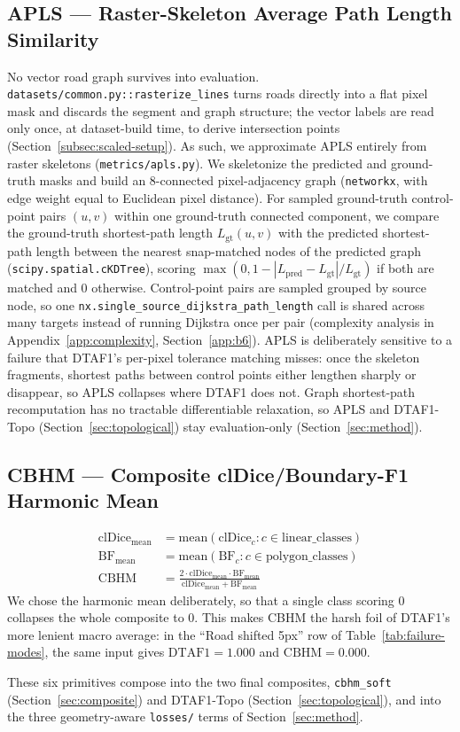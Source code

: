 \subsection{APLS --- Raster-Skeleton Average Path Length Similarity}
\label{subsec:apls}

No vector road graph survives into evaluation.
\texttt{datasets/common.py::\allowbreak{}rasterize\_lines} turns roads directly into a flat pixel
mask and discards the segment and graph structure; the vector labels are read only once, at
dataset-build time, to derive intersection points (Section~\ref{subsec:scaled-setup}). As such, we
approximate APLS entirely from raster skeletons (\texttt{metrics/apls.py}). We skeletonize the
predicted and ground-truth masks and build an 8-connected pixel-adjacency graph (\texttt{networkx},
with edge weight equal to Euclidean pixel distance). For sampled ground-truth control-point pairs
$(u,v)$ within one ground-truth connected component, we compare the ground-truth shortest-path
length $L_{\mathrm{gt}}(u,v)$ with the predicted shortest-path length between the nearest
snap-matched nodes of the predicted graph (\texttt{scipy.spatial.cKDTree}), scoring
$\max(0, 1 - |L_{\mathrm{pred}} - L_{\mathrm{gt}}| / L_{\mathrm{gt}})$ if both are matched and 0
otherwise. Control-point pairs are sampled grouped by source node, so one
\texttt{nx.single\_source\_dijkstra\_path\_length} call is shared across many targets instead of
running Dijkstra once per pair (complexity analysis in Appendix~\ref{app:complexity},
Section~\ref{app:b6}). APLS is deliberately sensitive to a failure that DTAF1's per-pixel tolerance
matching misses: once the skeleton fragments, shortest paths between control points either
lengthen sharply or disappear, so APLS collapses where DTAF1 does not. Graph shortest-path
recomputation has no tractable differentiable relaxation, so APLS and DTAF1-Topo
(Section~\ref{sec:topological}) stay evaluation-only (Section~\ref{sec:method}).

\subsection{CBHM --- Composite clDice/Boundary-F1 Harmonic Mean}
\label{subsec:cbhm}

\begin{align}
  \mathrm{clDice}_{\mathrm{mean}} &= \mathrm{mean}(\mathrm{clDice}_c : c \in \mathrm{linear\_classes}) \\
  \mathrm{BF}_{\mathrm{mean}} &= \mathrm{mean}(\mathrm{BF}_c : c \in \mathrm{polygon\_classes}) \\
  \mathrm{CBHM} &= \frac{2 \cdot \mathrm{clDice}_{\mathrm{mean}} \cdot \mathrm{BF}_{\mathrm{mean}}}
                        {\mathrm{clDice}_{\mathrm{mean}} + \mathrm{BF}_{\mathrm{mean}}}
\end{align}
We chose the harmonic mean deliberately, so that a single class scoring 0 collapses the whole
composite to 0. This makes CBHM the harsh foil of DTAF1's more lenient macro average: in the ``Road
shifted 5px'' row of Table~\ref{tab:failure-modes}, the same input gives $\mathrm{DTAF1}=1.000$ and
$\mathrm{CBHM}=0.000$.

These six primitives compose into the two final composites, \texttt{cbhm\_soft}
(Section~\ref{sec:composite}) and DTAF1-Topo (Section~\ref{sec:topological}), and into the three
geometry-aware \texttt{losses/} terms of Section~\ref{sec:method}.
